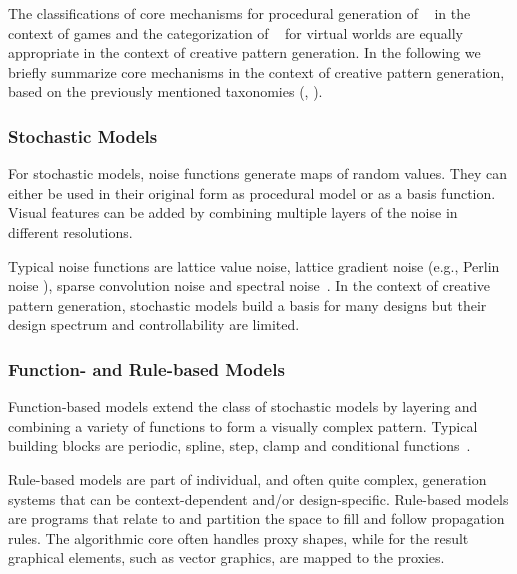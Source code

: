The classifications of core mechanisms for procedural generation of \citeauthor*{hendrikx_2013_pcg}~\cite{hendrikx_2013_pcg} in the context of games and the categorization of \citeauthor*{smelik_2014_aso}~\cite{smelik_2014_aso} for virtual worlds are equally appropriate in the context of creative pattern generation. In the following we briefly summarize core mechanisms in the context of creative pattern generation, based on the previously mentioned taxonomies (\cite{hendrikx_2013_pcg}, \cite{smelik_2014_aso}).

\subsubsection{Stochastic Models}

For stochastic models, noise functions generate maps of random values. They can either be used in their original form as procedural model or as a basis function. Visual features can be added by combining multiple layers of the noise in different resolutions. 

Typical noise functions are lattice value noise, lattice gradient noise (e.g., Perlin noise \cite{perlin_1985_ais}), sparse convolution noise and spectral noise~\cite{ebert_2003_tmp,lagae_2010_sap}. 
In the context of creative pattern generation, stochastic models build a basis for many designs but their design spectrum and controllability are limited.

\subsubsection{Function- and Rule-based Models} 

Function-based models extend the class of stochastic models by layering and combining a variety of functions to form a visually complex pattern. Typical building blocks are periodic, spline, step, clamp and conditional functions~\cite{ebert_2003_tmp}. 

Rule-based models are part of individual, and often quite complex, generation systems that can be context-dependent and/or design-specific. Rule-based models are programs that relate to and partition the space to fill and follow propagation rules. The algorithmic core often handles proxy shapes, while for the result graphical elements, such as vector graphics, are mapped to the proxies.
    
